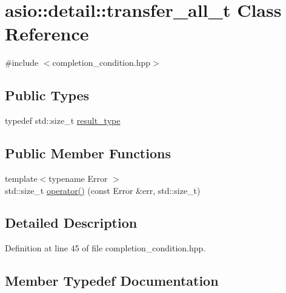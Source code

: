 \hypertarget{classasio_1_1detail_1_1transfer__all__t}{}\section{asio\+:\+:detail\+:\+:transfer\+\_\+all\+\_\+t Class Reference}
\label{classasio_1_1detail_1_1transfer__all__t}


{\ttfamily \#include $<$completion\+\_\+condition.\+hpp$>$}

\subsection*{Public Types}
\begin{DoxyCompactItemize}
\item 
typedef std\+::size\+\_\+t \hyperlink{classasio_1_1detail_1_1transfer__all__t_ac9caf0d570cd8433034264291b473f9c}{result\+\_\+type}
\end{DoxyCompactItemize}
\subsection*{Public Member Functions}
\begin{DoxyCompactItemize}
\item 
{\footnotesize template$<$typename Error $>$ }\\std\+::size\+\_\+t \hyperlink{classasio_1_1detail_1_1transfer__all__t_a456f0763427a94cd8475fc18f57bc851}{operator()} (const Error \&err, std\+::size\+\_\+t)
\end{DoxyCompactItemize}


\subsection{Detailed Description}


Definition at line 45 of file completion\+\_\+condition.\+hpp.



\subsection{Member Typedef Documentation}
\hypertarget{classasio_1_1detail_1_1transfer__all__t_ac9caf0d570cd8433034264291b473f9c}{}
